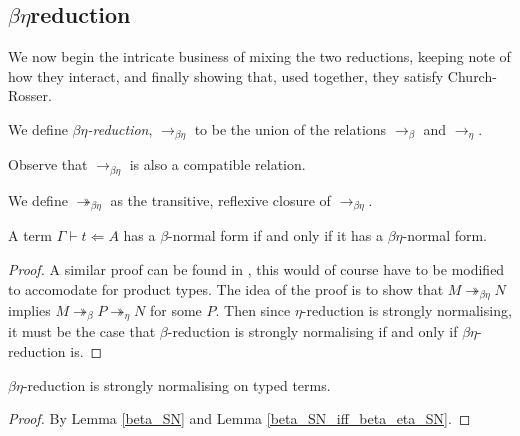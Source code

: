 
\subsection{\texorpdfstring{$\beta \eta$}-reduction}

We now begin the intricate business of mixing the two reductions, keeping note of how they interact, and finally showing that, used together, they satisfy Church-Rosser.

\begin{defin}
    We define \emph{$\beta\eta$-reduction}, $\to_{\beta\eta}$ to be the union of the relations $\to_\beta$ and $\to_\eta$.
\end{defin}

\begin{remark}
    Observe that $\to_{\beta\eta}$ is also a compatible relation.
\end{remark}

\begin{defin}
    We define $\twoheadrightarrow_{\beta\eta}$ as the transitive, reflexive closure of $\to_{\beta\eta}$.
\end{defin}

\begin{lemma}\label{beta_SN_iff_beta_eta_SN}
    A term $\Gamma \vdash t \Leftarrow A$ has a $\beta$-normal form if and only if it has a $\beta \eta$-normal form.
\end{lemma}

\begin{proof}
    A similar proof can be found in \cite[Corollary 15.1.5]{barendregt1984lambda}, this would of course have to be modified to accomodate for product types. The idea of the proof is to show that $M \twoheadrightarrow_{\beta\eta} N$ implies $M \twoheadrightarrow_{\beta} P \twoheadrightarrow_{\eta} N$ for some $P$. Then since $\eta$-reduction is strongly normalising, it must be the case that $\beta$-reduction is strongly normalising if and only if $\beta \eta$-reduction is.
\end{proof}

\begin{cor}\label{beta_eta_SN}
    $\beta \eta$-reduction is strongly normalising on typed terms.
\end{cor}

\begin{proof}
    By Lemma \ref{beta_SN} and Lemma \ref{beta_SN_iff_beta_eta_SN}.
\end{proof}

